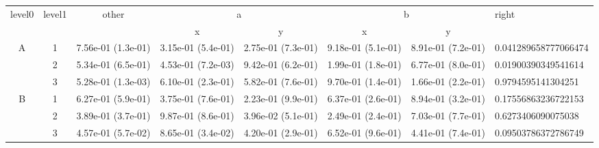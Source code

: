 \begin{tabular}{cccccccl}
\toprule
\multirow{2}{*}{level0} & \multirow{2}{*}{level1}& \multirow{2}{*}{other}&\multicolumn{2}{c}{a}&\multicolumn{2}{c}{b}& \multirow{2}{*}{right}\tabularnewline
\cmidrule(lr){4-5}
\cmidrule(lr){6-7}
&&&x&y&x&y\tabularnewline
\midrule
\multirow{3}{*}{A}&1& 7.56e-01 (1.3e-01)& 3.15e-01 (5.4e-01)& 2.75e-01 (7.3e-01)& 9.18e-01 (5.1e-01)& 8.91e-01 (7.2e-01)& 0.041289658777066474\tabularnewline
&2& 5.34e-01 (6.5e-01)& 4.53e-01 (7.2e-03)& 9.42e-01 (6.2e-01)& 1.99e-01 (1.8e-01)& 6.77e-01 (8.0e-01)& 0.01900390349541614\tabularnewline
&3& 5.28e-01 (1.3e-03)& 6.10e-01 (2.3e-01)& 5.82e-01 (7.6e-01)& 9.70e-01 (1.4e-01)& 1.66e-01 (2.2e-01)& 0.9794595141304251\tabularnewline
\midrule
\multirow{3}{*}{B}&1& 6.27e-01 (5.9e-01)& 3.75e-01 (7.6e-01)& 2.23e-01 (9.9e-01)& 6.37e-01 (2.6e-01)& 8.94e-01 (3.2e-01)& 0.17556863236722153\tabularnewline
&2& 3.89e-01 (3.7e-01)& 9.87e-01 (8.6e-01)& 3.96e-02 (5.1e-01)& 2.49e-01 (2.4e-01)& 7.03e-01 (7.7e-01)& 0.6273406090075038\tabularnewline
&3& 4.57e-01 (5.7e-02)& 8.65e-01 (3.4e-02)& 4.20e-01 (2.9e-01)& 6.52e-01 (9.6e-01)& 4.41e-01 (7.4e-01)& 0.09503786372786749\tabularnewline
\bottomrule
\end{tabular}
